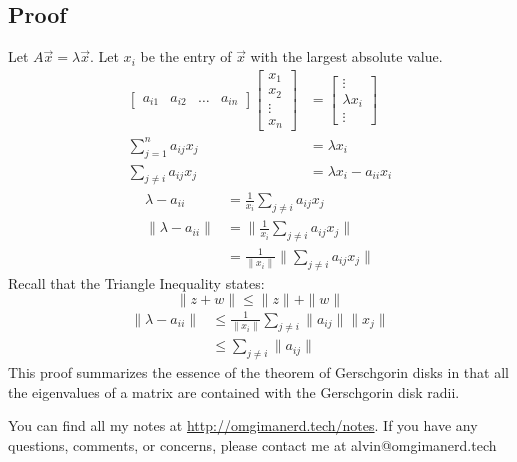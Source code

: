 \documentclass{math}
\begin{document}
\subsection*{Proof}
Let \( A\vec{x} = \lambda\vec{x} \). Let \( x_i \) be the entry of \( \vec{x} \)
with the largest absolute value.
\begin{align*}
  \begin{bmatrix}a_{i1} & a_{i2} & \dots & a_{in}\end{bmatrix}
  \begin{bmatrix}x_1 \\ x_2 \\ \vdots \\ x_n\end{bmatrix} &= \begin{bmatrix}
    \vdots \\ \lambda x_i \\ \vdots
  \end{bmatrix} \\
  \sum_{j=1}^na_{ij}x_j &= \lambda x_i \\
  \sum_{j\ne i}a_{ij}x_j &= \lambda x_i-a_{ii}x_i
\end{align*}
\begin{align*}
  \lambda-a_{ii} &= \frac{1}{x_i}\sum_{j\ne i}a_{ij}x_j \\
  \|\lambda-a_{ii}\| &= \|\frac{1}{x_i}\sum_{j\ne i}a_{ij}x_j\| \\
  &= \frac{1}{\|x_i\|}\|\sum_{j\ne i}a_{ij}x_j\|
\end{align*}
Recall that the Triangle Inequality states:
\[ \|z+w\| \le \|z\|+\|w\| \]
\begin{align*}
  \|\lambda-a_{ii}\| &\le \frac{1}{\|x_i\|}\sum_{j\ne i}\|a_{ij}\|\|x_j\| \\
  &\le \sum_{j\ne i}\|a_{ij}\|
\end{align*}
This proof summarizes the essence of the theorem of Gerschgorin disks in that
all the eigenvalues of a matrix are contained with the Gerschgorin disk radii.

\begin{center}
  You can find all my notes at \url{http://omgimanerd.tech/notes}. If you have
  any questions, comments, or concerns, please contact me at
  alvin@omgimanerd.tech
\end{center}
\end{document}

